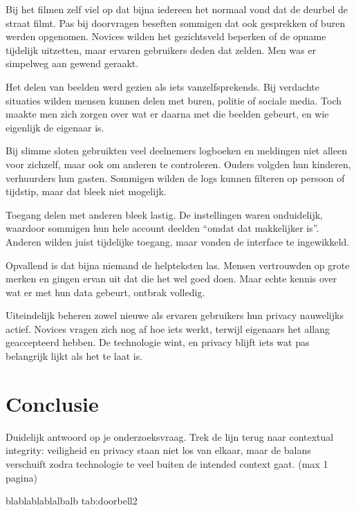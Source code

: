 \documentclass[nonacm,sigconf]{acmart}
\begin{document}
    Bij het filmen zelf viel op dat bijna iedereen het normaal vond dat de deurbel de straat filmt.
    Pas bij doorvragen beseften sommigen dat ook gesprekken of buren werden opgenomen.
    Novices wilden het gezichtsveld beperken of de opname tijdelijk uitzetten, maar ervaren gebruikers deden dat zelden.
    Men was er simpelweg aan gewend geraakt.

    Het delen van beelden werd gezien als iets vanzelfsprekends.
    Bij verdachte situaties wilden mensen kunnen delen met buren, politie of sociale media.
    Toch maakte men zich zorgen over wat er daarna met die beelden gebeurt, en wie eigenlijk de eigenaar is.

    Bij slimme sloten gebruikten veel deelnemers logboeken en meldingen niet alleen voor zichzelf, maar ook om anderen te controleren.
    Ouders volgden hun kinderen, verhuurders hun gasten.
    Sommigen wilden de logs kunnen filteren op persoon of tijdstip, maar dat bleek niet mogelijk.

    Toegang delen met anderen bleek lastig.
    De instellingen waren onduidelijk, waardoor sommigen hun hele account deelden “omdat dat makkelijker is”.
    Anderen wilden juist tijdelijke toegang, maar vonden de interface te ingewikkeld.

    Opvallend is dat bijna niemand de helpteksten las.
    Mensen vertrouwden op grote merken en gingen ervan uit dat die het wel goed doen.
    Maar echte kennis over wat er met hun data gebeurt, ontbrak volledig.

    Uiteindelijk beheren zowel nieuwe als ervaren gebruikers hun privacy nauwelijks actief.
    Novices vragen zich nog af hoe iets werkt, terwijl eigenaars het allang geaccepteerd hebben.
    De technologie wint, en privacy blijft iets wat pas belangrijk lijkt als het te laat is.

    \section{Conclusie}
    Duidelijk antwoord op je onderzoeksvraag.
    Trek de lijn terug naar contextual integrity: veiligheid en privacy staan niet los van elkaar, maar de balans verschuift zodra technologie te veel buiten de intended context gaat. (max 1 pagina)

    \SimpleTable
    {blablablablalbalb}
    {tab:doorbell2}
    {
    }

    \printbibliography

    \balance %
\end{document}
